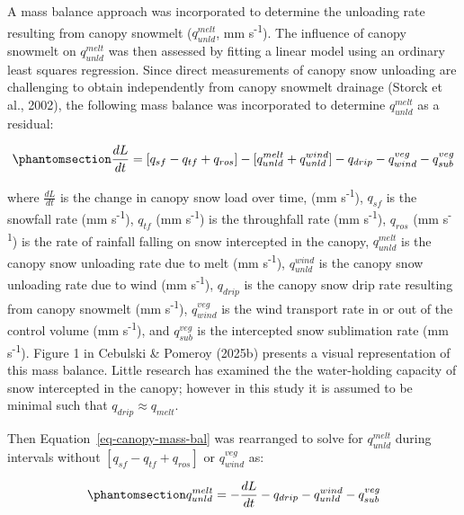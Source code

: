 \documentclass[
  letterpaper,
  DIV=11,
  numbers=noendperiod]{scrartcl}
\begin{document}
A mass balance approach was incorporated to determine the unloading rate
resulting from canopy snowmelt (\(q_{unld}^{melt}\), mm
s\textsuperscript{-1}). The influence of canopy snowmelt on
\(q_{unld}^{melt}\) was then assessed by fitting a linear model using an
ordinary least squares regression. Since direct measurements of canopy
snow unloading are challenging to obtain independently from canopy
snowmelt drainage (Storck et al., 2002), the following mass balance was
incorporated to determine \(q_{unld}^{melt}\) as a residual:

\begin{equation}\phantomsection\label{eq-canopy-mass-bal}{
\frac{dL}{dt} = 
[q_{sf} - q_{tf} + q_{ros}] - [q_{unld}^{melt} + q_{unld}^{wind}] - q_{drip} - q_{wind}^{veg} - q_{sub}^{veg}
}\end{equation}

where \(\frac{dL}{dt}\) is the change in canopy snow load over time, (mm
s\textsuperscript{-1}), \(q_{sf}\) is the snowfall rate (mm
s\textsuperscript{-1}), \(q_{tf}\) (mm s\textsuperscript{-1}) is the
throughfall rate (mm s\textsuperscript{-1}), \(q_{ros}\) (mm
s\textsuperscript{-1}) is the rate of rainfall falling on snow
intercepted in the canopy, \(q_{unld}^{melt}\) is the canopy snow
unloading rate due to melt (mm s\textsuperscript{-1}),
\(q_{unld}^{wind}\) is the canopy snow unloading rate due to wind (mm
s\textsuperscript{-1}), \(q_{drip}\) is the canopy snow drip rate
resulting from canopy snowmelt (mm s\textsuperscript{-1}),
\(q_{wind}^{veg}\) is the wind transport rate in or out of the control
volume (mm s\textsuperscript{-1}), and \(q_{sub}^{veg}\) is the
intercepted snow sublimation rate (mm s\textsuperscript{-1}). Figure 1
in Cebulski \& Pomeroy (2025b) presents a visual representation of this
mass balance. Little research has examined the the water-holding
capacity of snow intercepted in the canopy; however in this study it is
assumed to be minimal such that \(q_{drip} \approx q_{melt}\).

Then Equation~\ref{eq-canopy-mass-bal} was rearranged to solve for
\(q_{unld}^{melt}\) during intervals without
\([q_{sf} - q_{tf} + q_{ros}]\) or \(q_{wind}^{veg}\) as:

\begin{equation}\phantomsection\label{eq-unld-melt-mass-bal}{
q_{unld}^{melt} = -\frac{dL}{dt} - q_{drip} - q_{unld}^{wind} - q_{sub}^{veg}
}\end{equation}
\end{document}
